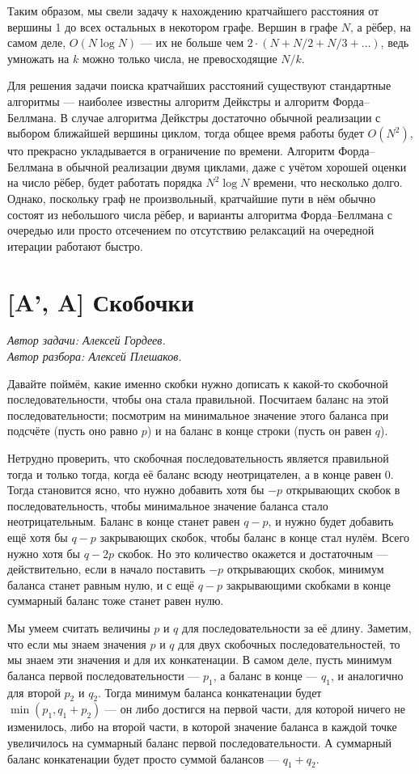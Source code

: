 \documentclass[12pt]{article}
\theoremstyle{definition}
\begin{document}
Таким образом, мы свели задачу к нахождению кратчайшего расстояния от вершины 1 до всех остальных в некотором графе. Вершин в графе $N$, а рёбер, на самом деле, $O(N \log N)$ ---
их не больше чем $2 \cdot (N + N / 2 + N / 3 + \dots)$, ведь умножать на $k$ можно только числа, не превосходящие $N / k$.

Для решения задачи поиска кратчайших расстояний существуют стандартные алгоритмы ---
наиболее известны алгоритм Дейкстры и алгоритм Форда--Беллмана. В случае алгоритма Дейкстры достаточно обычной реализации с выбором ближайшей вершины циклом, тогда общее время работы будет $O(N^2)$, что прекрасно укладывается в ограничение по времени. Алгоритм Форда--Беллмана в обычной реализации двумя циклами, даже с учётом хорошей оценки на число рёбер, будет работать порядка $N^2 \log N$ времени, что
несколько долго. Однако, поскольку граф не произвольный, кратчайшие пути в нём обычно состоят из небольшого числа рёбер, и варианты алгоритма Форда--Беллмана с очередью или просто отсечением по отсутствию релаксаций на очередной итерации работают быстро.

\section{[A', A] Скобочки}
\textit{Автор задачи: Алексей Гордеев.} \\
\textit{Автор разбора: Алексей Плешаков.}

Давайте поймём, какие именно скобки нужно дописать к какой-то скобочной последовательности, чтобы она стала правильной. Посчитаем баланс на этой последовательности; посмотрим на минимальное значение этого баланса при подсчёте (пусть оно равно $p$) и на баланс в конце строки (пусть он равен $q$).

Нетрудно проверить, что скобочная последовательность является правильной тогда и только тогда, когда её баланс всюду неотрицателен, а в конце равен 0.
Тогда становится ясно, что нужно добавить хотя бы $-p$ открывающих скобок в последовательность, чтобы минимальное значение баланса стало неотрицательным.
Баланс в конце станет равен $q - p$, и нужно будет добавить ещё хотя бы $q - p$ закрывающих скобок, чтобы баланс
в конце стал нулём. Всего нужно хотя бы $q - 2p$ скобок. Но это количество окажется и достаточным --- действительно, если в начало поставить $-p$ открывающих скобок,
минимум баланса станет равным нулю, и с ещё $q - p$ закрывающими скобками в конце суммарный баланс тоже станет равен нулю.

Мы умеем считать величины $p$ и $q$ для последовательности за её длину. Заметим, что если мы знаем значения $p$ и $q$ для двух скобочных последовательностей, то мы знаем эти значения и для их конкатенации. В самом деле, пусть минимум баланса первой последовательности --- $p_1$, а баланс в конце --- $q_1$, и аналогично для второй $p_2$ и $q_2$.
Тогда минимум баланса конкатенации будет $\min(p_1, q_1 + p_2)$ --- он либо достигся на первой части, для которой ничего не изменилось, либо на второй части, в которой
значение баланса в каждой точке увеличилось на суммарный баланс первой последовательности. А суммарный баланс конкатенации будет просто суммой балансов --- $q_1 + q_2$.
\end{document}
